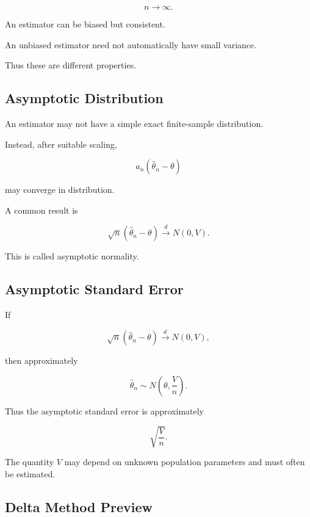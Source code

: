 \[
n\to\infty.
\]

An estimator can be biased but consistent.

An unbiased estimator need not automatically have small variance.

Thus these are different properties.

\subsection{Asymptotic Distribution}
\label{subsec:asymptotic-distribution}

An estimator may not have a simple exact finite-sample distribution.

Instead, after suitable scaling,

\[
a_n
(
\widehat{\theta}_n-\theta
)
\]

may converge in distribution.

A common result is

\[
\boxed{
\sqrt{n}
(
\widehat{\theta}_n-\theta
)
\xrightarrow{d}
N(0,V).
}
\]

This is called asymptotic normality.

\subsection{Asymptotic Standard Error}
\label{subsec:asymptotic-standard-error}

If

\[
\sqrt{n}
(
\widehat{\theta}_n-\theta
)
\xrightarrow{d}
N(0,V),
\]

then approximately

\[
\widehat{\theta}_n
\sim
N
\left(
\theta,
\frac{V}{n}
\right).
\]

Thus the asymptotic standard error is approximately

\[
\boxed{
\sqrt{
\frac{V}{n}
}.
}
\]

The quantity \(V\) may depend on unknown population parameters and must
often be estimated.

\subsection{Delta Method Preview}
\label{subsec:delta-method-sampling}

